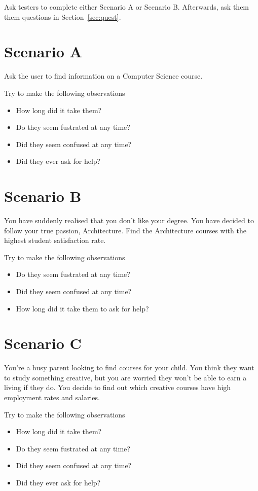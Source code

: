 \documentclass[11pt]{article} %
\begin{document}
Ask testers to complete either Scenario A or Scenario B. Afterwards, ask them them questions in Section~\ref{sec:quest}.
\section{Scenario A}
Ask the user to find information on a Computer Science course.

Try to make the following observations
\begin{itemize}
    \item How long did it take them?
    \item Do they seem fustrated at any time?
    \item Did they seem confused at any time?
    \item Did they ever ask for help?
\end{itemize}
\section{Scenario B}
You have suddenly realised that you don't like your degree. You have decided to follow your true passion, Architecture. Find the Architecture courses with the highest student satisfaction rate.

Try to make the following observations
\begin{itemize}
    \item Do they seem fustrated at any time?
    \item Did they seem confused at any time?
    \item How long did it take them to ask for help?
\end{itemize}
\section{Scenario C}
You're a busy parent looking to find courses for your child. You think they want to study something creative, but you are worried they won't be able to earn a living if they do. You decide to find out which creative courses have high employment rates and salaries.

Try to make the following observations
\begin{itemize}
    \item How long did it take them?
    \item Do they seem fustrated at any time?
    \item Did they seem confused at any time?
    \item Did they ever ask for help?
\end{itemize}
\end{document}
